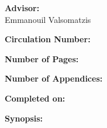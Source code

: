 \begin{titlepage}
\begin{minipage}{0.4\textwidth}
\begin{description}
			\item {\bf Advisor:}\\
			Emmanouil Valsomatzis\\

			\item {\bf Circulation Number:} \rprints
			\item {\bf Number of Pages:} \rlastpage
			\item {\bf Number of Appendices:} \rappendices
			\item {\bf Completed on:} \rdeadline
		\end{description}
	\end{minipage}
	\hfill
	\begin{minipage}{0.4\textwidth}
		\textbf{Synopsis:}\bigskip\bigskip
		\vfill
		\fbox{
		\begin{minipage}{\textwidth}
			\vspace{5pt}
			\small 
			\vspace{5pt}
		\end{minipage}}
	\end{minipage}
	\newline\newline\newline
\end{titlepage}
